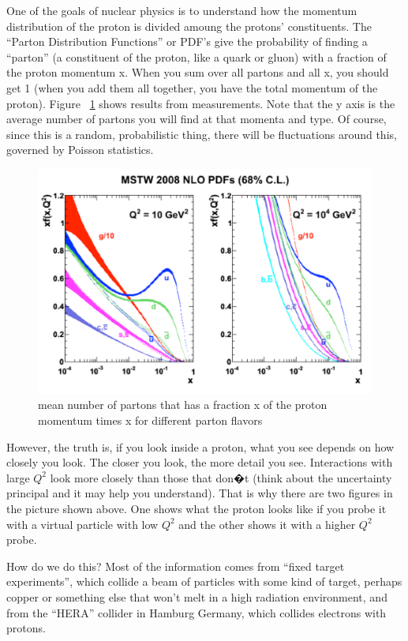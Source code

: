 One of the goals of nuclear physics is to understand how the momentum distribution of the proton is divided amoung the protons' constituents.  The ``Parton Distribution Functions'' or PDF's give the probability of finding a ``parton'' (a constituent of the proton, like a quark or gluon) with a fraction of the proton momentum x.  When you sum over all partons and all x, you should get 1 (when you add them all together, you have the total momentum of the proton).  Figure ~\ref{fig:pdfpdf} shows results from measurements. Note that the y axis is the average number of partons you will find at that momenta and type. Of course, since this is a random, probabilistic thing, there will be fluctuations around this, governed by Poisson statistics.

\begin{figure}[h]
\centering\includegraphics[scale=0.5]{./protonprotoncollisions/Pictures/fig2.pdf}
\caption{mean number of partons that has a fraction x of the proton momentum times x for different parton flavors}
\label{fig:pdfpdf}
\end{figure}
However, the truth is, if you look inside a proton, what you see depends on how closely you look. The closer you look, the more detail you see. Interactions with large \(Q^{2}\) look more closely than those that don�t (think about the uncertainty principal and it may help you understand).  That is why there are two figures in the picture shown above. One shows what the proton looks like if you probe it with a virtual particle with low \(Q^{2}\) and the other shows it with a higher \(Q^{2}\) probe.

How do we do this?  Most of the information comes from ``fixed target experiments'', which collide a beam of particles with some kind of target, perhaps copper or something else that won't melt in a high radiation environment, and from the ``HERA'' collider in Hamburg Germany, which collides electrons with protons.

